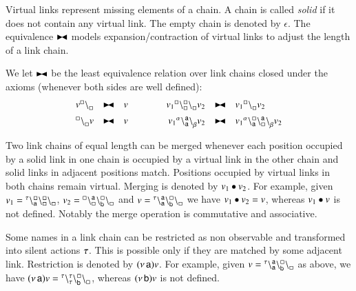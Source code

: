Virtual links represent missing elements of a chain. 
A chain is called \emph{solid} if it does not contain any virtual link.
The empty chain is denoted by $\epsilon$.
The equivalence $\blackstretcheq$ models expansion/contraction of virtual links to adjust the length of a link chain.


\begin{definition}\label{def:black}
We let $\blackstretcheq$ be the least equivalence relation 
over link chains closed under the axioms (whenever both sides are well defined):
\[
\begin{array}{rclcrcl}
v\link{\noact}{\noact} & \blackstretcheq &  v & \qquad &
v_1 \startchain{\noact}\chainedlink{\noact}{\noact}\chainend{\noact}v_2 & \blackstretcheq & v_1 \link{\noact}{\noact} v_2\\[5pt]
\link{\noact}{\noact}v & \blackstretcheq & v & &
v_1 \startchain{\alpha}\chainedlink{\mathsf{a}}{\mathsf{a}}\chainend{\beta} v_2
& \blackstretcheq & 
v_1 \startchain{\alpha}\chainedlink{\mathsf{a}}{\noact}\chainedlink{\noact}{\mathsf{a}}\chainend{\beta}v_2 
\end{array}
\]
\end{definition}

Two link chains of equal length can be merged whenever each position occupied by a solid link in one chain is occupied by a virtual link in the other chain and solid links in adjacent positions match. Positions occupied by virtual links in both chains remain virtual. Merging is denoted by $v_1 \bullet v_2$.
%
For example, given $v_1 = {}^{\tau}_{}\backslash_{\mathsf{a}}^{\scriptstyle {\square}}\backslash_{\scriptstyle {\square}}^{\scriptstyle {\square}}\backslash_{\scriptstyle {\square}}^{}$, $v_2 = {}^{\scriptstyle {\square}}_{}\backslash_{\scriptstyle {\square}}^{\mathsf{a}}\backslash_{\mathsf{b}}^{\scriptstyle {\square}}\backslash_{\scriptstyle {\square}}^{}$ and $v = {}^{\tau}_{}\backslash_{\mathsf{a}}^{\mathsf{a}}\backslash_{\mathsf{b}}^{\scriptstyle {\square}}\backslash_{\scriptstyle {\square}}^{}$
we have $v_1 \bullet v_2 = v$, whereas $v_1 \bullet v$ is not defined. Notably the merge operation is commutative and associative.

Some names in a link chain can be restricted as non observable and transformed into silent actions $\tau$. This is possible only if they are matched by some adjacent link. Restriction is denoted by $(\nu\, \mathsf{a})v$.
%
For example, given $v = {}^{\tau}_{}\backslash_{\mathsf{a}}^{\mathsf{a}}\backslash_{\mathsf{b}}^{\scriptstyle {\square}}\backslash_{\scriptstyle {\square}}^{}$ as above, we have 
$(\nu\, \mathsf{a})v = {}^{\tau}_{}\backslash_{\tau}^{\tau}\backslash_{\mathsf{b}}^{\scriptstyle {\square}}\backslash_{\scriptstyle {\square}}^{}$,
whereas $(\nu\, \mathsf{b})v$ is not defined.

